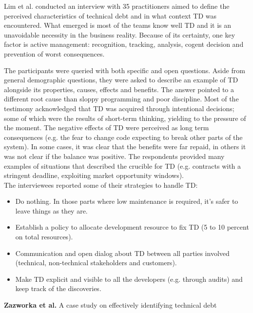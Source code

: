 Lim et al. conducted an interview with 35 practitioners aimed to define the perceived characteristics of technical debt and in what context TD was encountered. What emerged is most of the teams know well TD and it is an unavoidable necessity in the business reality. Because of its certainty, one key factor is active management: recognition, tracking, analysis, cogent decision and prevention of worst consequences.
 
The participants were queried with both specific and open questions. Aside from general demographic questions, they were asked to describe an example of TD alongside its properties, causes, effects and benefits. 
The answer pointed to a different root cause than sloppy programming and poor discipline. Most of the testimony acknowledged that TD was acquired through intentional decisions; some of which were the results of short-term thinking, yielding to the pressure of the moment.
The negative effects of TD were perceived as long term consequences (e.g. the fear to change code expecting to break other parts of the system). 
In some cases, it was clear that the benefits were far repaid, in others it was not clear if the balance was positive.
The respondents provided many examples of situations that described the crucible for TD (e.g. contracts with a stringent deadline, exploiting market opportunity windows). 
\\
The interviewees reported some of their strategies to handle TD:
\begin{itemize}
    \item Do nothing. In those parts where low maintenance is required, it's safer to leave things as they are.
    \item Establish a policy to allocate development resource to fix TD (5 to 10 percent on total resources).
    \item Communication and open dialog about TD between all parties involved (technical, non-technical stakeholders and customers).
    \item Make TD explicit and visible to all the developers (e.g. through audits) and keep track of the discoveries.
\end{itemize}
\textbf{Zazworka et al.} \cite{zazworka2013case} A case study on effectively identifying technical debt

